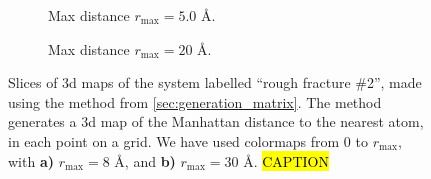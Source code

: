 \begin{figure}[htpb]%
    \centering%
    \setlength{\myfigwidth}{0.9\textwidth}%
    \begin{subfigure}[b]{\myfigwidth}%
        \caption{Max distance $r_\text{max}=5.0$ \AA.%
        \label{fig:generation_matrix_r05}}%
    \end{subfigure}%
    \vspace{10pt}
    \begin{subfigure}[b]{\myfigwidth}%
        \caption{Max distance $r_\text{max}=20$ \AA.%
        \label{fig:generation_matrix_r11}}%
    \end{subfigure}%
    \caption{%
        Slices of 3d maps of the system labelled ``rough fracture \#2'', made using the method from \cref{sec:generation_matrix}. The method generates a 3d map of the Manhattan distance to the nearest atom, in each point on a grid. We have used colormaps from 0 to $r_\text{max}$, with \textbf{a)} $r_\text{max} = 8$ \AA, and \textbf{b)} $r_\text{max} = 30$ \AA.%
        \hl{CAPTION}%
    }%
\end{figure}%